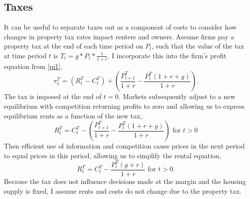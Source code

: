 \documentclass[ecta,nameyear,draft]{econsocart}
\theoremstyle{plain}
\theoremstyle{remark}
\begin{document}
\subsection{Taxes}
It can be useful to separate taxes out as a component of costs to consider how changes in property tax rates impact renters and owners. Assume firms pay a property tax at the end of each time period on $P_{t}$, such that the value of the tax at time period $t$ is $T_t=g*P_{t}*\frac{1}{1+r}$. I incorporate this into the firm's profit equation from \ref{pi1},
\begin{equation*}
	\pi^T_t = (R^T_t-C^T_t)+\left(\frac{P^T_{t+1}}{1+r}-\frac{P^T_t(1+r+g)}{1+r}\right).\label{pi1T}
\end{equation*}
The tax is imposed at the end of $t=0$. Markets subsequently adjust to a new equilibrium with competition returning profits to zero and allowing us to express equilibrium rents as a function of the new tax,
\begin{equation*}
	R^T_t=C^T_t-\left(\frac{P^T_{t+1}}{1+r}-\frac{P^T_t(1+r+g)}{1+r}\right) \text{ for }t>0
\end{equation*}
Then efficient use of information and competition cause prices in the next period to equal prices in this period, allowing us to simplify the rental equation,
\begin{equation*}
R^T_t=C^T_t-\frac{P^T_{t}(g+r)}{1+r}\text{ for }t>0.
\end{equation*}
Because the tax does not influence decisions made at the margin and the housing supply is fixed, I assume rents and costs do not change due to the property tax. 
\end{document}
